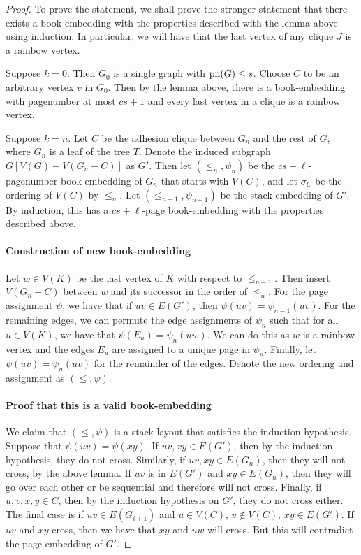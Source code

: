 \begin{proof}
	To prove the statement, we shall prove the stronger statement that there exists a book-embedding with the properties described with the lemma above using induction. In particular, we will have that the last vertex of any clique \(J\) is a rainbow vertex.
	
	Suppose \(k = 0\). Then \(G_0\) is a single graph with \(\operatorname{pn}(G) \leq s\). Choose \(C\) to be an arbitrary vertex \(v\) in \(G_0\). Then by the lemma above, there is a book-embedding with pagenumber at most \(cs + 1\) and every last vertex in a clique is a rainbow vertex.
	
	Suppose \(k = n\). Let \(C\) be the adhesion clique between \(G_n\) and the rest of \(G\), where \(G_n\) is a leaf of the tree \(T\). Denote the induced subgraph \(G[V(G) - V(G_n - C)]\) as \(G'\). Then let \((\leq_n, \psi_n)\) be the \(cs + \ell\)-pagenumber book-embedding of \(G_n\) that starts with \(V(C)\), and let \(\sigma_C\) be the ordering of \(V(C)\) by \(\leq_n\). Let \((\leq_{n-1}, \psi_{n-1})\) be the stack-embedding of \(G'\). By induction, this has a \(cs + \ell\)-page book-embedding with the properties described above.
	
	\paragraph{Construction of new book-embedding}
	Let \(w \in V(K)\) be the last vertex of \(K\) with respect to \(\leq_{n-1}\). Then insert \(V(G_n - C)\) between \(w\) and its successor in the order of \(\leq_{n}\). For the page assignment \(\psi\), we have that if \(uv \in E(G')\), then \(\psi(uv) = \psi_{n-1}(uv)\). For the remaining edges, we can permute the edge assignments of \(\psi_n\) such that for all \(u \in V(K)\), we have that \(\psi(E_u) = \psi_n(uw)\). We can do this as \(w\) is a rainbow vertex and the edges \(E_u\) are assigned to a unique page in \(\psi_n\). Finally, let \(\psi(uv) = \psi_n(uv)\) for the remainder of the edges. Denote the new ordering and assignment as \((\leq, \psi)\). 
	\paragraph{Proof that this is a valid book-embedding}
	We claim that \((\leq , \psi)\) is a stack layout that satisfies the induction hypothesis. Suppose that \(\psi(uv) = \psi(xy)\). If \(uv, xy \in E(G')\), then by the induction hypothesis, they do not cross. Similarly, if \(uv, xy \in E(G_n)\), then they will not cross, by the above lemma. If \(uv\) is in \(E(G')\) and \(xy \in E(G_n)\), then they will go over each other or be sequential and therefore will not cross. 
	Finally, if \(u, v, x, y \in C\), then by the induction hypothesis on \(G'\), they do not cross either. The final case is if \(uv \in E(G_{i + 1})\) and \(u \in V(C)\), \(v \notin V(C)\), \(xy \in E(G')\). If \(uv\) and \(xy\) cross, then we have that \(xy\) and \(uw\) will cross. But this will contradict the page-embedding of \(G'\).
	

\end{proof}

